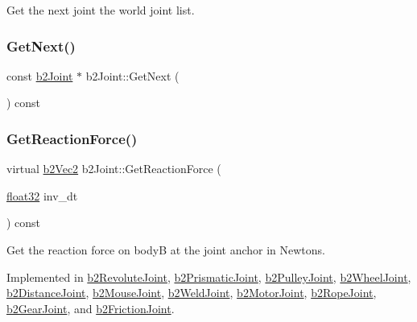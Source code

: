 Get the next joint the world joint list. 

\mbox{\label{classb2_joint_aac18301414d6ca0a20aefb471c709e78}} 
\subsubsection{\texorpdfstring{GetNext()}{GetNext()}\hspace{0.1cm}{\footnotesize\ttfamily [2/2]}}
{\footnotesize\ttfamily const \mbox{\hyperlink{classb2_joint}{b2\+Joint}} $\ast$ b2\+Joint\+::\+Get\+Next (\begin{DoxyParamCaption}{ }\end{DoxyParamCaption}) const\hspace{0.3cm}{\ttfamily [inline]}}

\mbox{\label{classb2_joint_a7e0eddefb9b69ad050b8ef6425838a74}} 
\subsubsection{\texorpdfstring{GetReactionForce()}{GetReactionForce()}}
{\footnotesize\ttfamily virtual \mbox{\hyperlink{structb2_vec2}{b2\+Vec2}} b2\+Joint\+::\+Get\+Reaction\+Force (\begin{DoxyParamCaption}\item[{\mbox{\hyperlink{b2_settings_8h_aacdc525d6f7bddb3ae95d5c311bd06a1}{float32}}}]{inv\+\_\+dt }\end{DoxyParamCaption}) const\hspace{0.3cm}{\ttfamily [pure virtual]}}



Get the reaction force on bodyB at the joint anchor in Newtons. 



Implemented in \mbox{\hyperlink{classb2_revolute_joint_abeb7bf941589aed0d7f330a578a62024}{b2\+Revolute\+Joint}}, \mbox{\hyperlink{classb2_prismatic_joint_ad73abb0ea7e316e863c35f4179ebc7ab}{b2\+Prismatic\+Joint}}, \mbox{\hyperlink{classb2_pulley_joint_a90904a458169a22fe0a9e2c4f5332101}{b2\+Pulley\+Joint}}, \mbox{\hyperlink{classb2_wheel_joint_a93e34e700ce794db1acee07562027b2a}{b2\+Wheel\+Joint}}, \mbox{\hyperlink{classb2_distance_joint_a6aa951e5bbfcae8a617987955cadbed5}{b2\+Distance\+Joint}}, \mbox{\hyperlink{classb2_mouse_joint_a1af7bb9f41076b29a1ddefd7b6c2f27b}{b2\+Mouse\+Joint}}, \mbox{\hyperlink{classb2_weld_joint_ae5a6e89a36fc7fec7aae528ec2895308}{b2\+Weld\+Joint}}, \mbox{\hyperlink{classb2_motor_joint_a85a3ac568e797d0620dcf4f7532ed949}{b2\+Motor\+Joint}}, \mbox{\hyperlink{classb2_rope_joint_a4637fe7f22383bbc00d23ab4961b1146}{b2\+Rope\+Joint}}, \mbox{\hyperlink{classb2_gear_joint_aa1dc4c7c58d8ee656726c372edb7abcd}{b2\+Gear\+Joint}}, and \mbox{\hyperlink{classb2_friction_joint_a39d2c9ec06e6dd9733a8c4d72b4db2f0}{b2\+Friction\+Joint}}.

